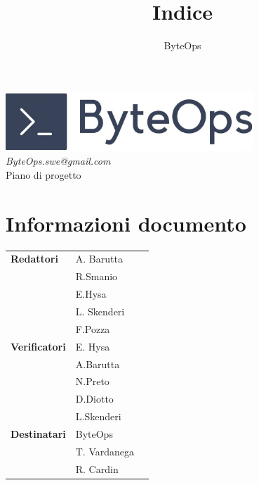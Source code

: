 \documentclass{article}
\title{\textbf{\fontsize{30}{6}\selectfont Indice}}
\author{\fontsize{14}{6}\selectfont ByteOps}
\date{}
\begin{document}
\pagestyle{fancy}
\begin{center}
    \includegraphics[width = 0.7\textwidth]{../Images/logo.png} \\
    \vspace{0.2cm}
    \textcolor[RGB]{60, 60, 60}{\textit{ByteOps.swe@gmail.com}} \\
    \vspace{1cm}
    \fontsize{16}{6}\selectfont Piano di progetto \\
    \vspace{0.5cm}
\end{center}

\section*{Informazioni documento}
\def\arraystretch{1.2}
\begin{tabular}{>{\raggedleft\arraybackslash}p{}|>{\raggedright\arraybackslash}p{}c}
    \hline
    \addlinespace
    \textbf{Redattori}    & A. Barutta\\ & R.Smanio\\ & E.Hysa\\ & L. Skenderi\\ & F.Pozza \vspace{10pt} \\
    \textbf{Verificatori} & E. Hysa\\ & A.Barutta\\ & N.Preto\\ & D.Diotto\\ & L.Skenderi \vspace{10pt} \\
    \textbf{Destinatari}  & ByteOps\\ & T. Vardanega   \\ & R. Cardin \vspace{10pt} \\
\end{tabular}
\pagebreak
\end{document}
